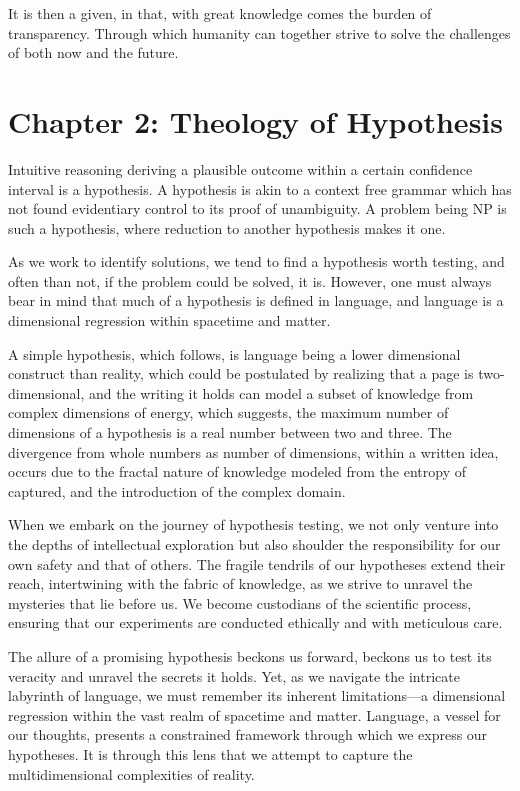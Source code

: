\documentclass[ebook,12pt,oneside,openany]{memoir}
\begin{document}
\indent 	It is then a given, in that, with great knowledge comes the burden of transparency. Through which humanity can together strive to solve the challenges of both now and the future.
\chapter*{Chapter 2: Theology of Hypothesis}


\indent \indent Intuitive reasoning deriving a plausible outcome within a certain confidence interval is a hypothesis. A hypothesis is akin to a context free grammar which has not found evidentiary control to its proof of unambiguity. A problem being NP is such a hypothesis, where reduction to another hypothesis makes it one.

\indent 	As we work to identify solutions, we tend to find a hypothesis worth testing, and often than not, if the problem could be solved, it is. However, one must always bear in mind that much of a hypothesis is defined in language, and language is a dimensional regression within spacetime and matter.

\indent 	A simple hypothesis, which follows, is language being a lower dimensional construct than reality, which could be postulated by realizing that a page is two-dimensional, and the writing it holds can model a subset of knowledge from complex dimensions of energy,  which suggests, the maximum number of dimensions of a hypothesis is a real number between two and three. The divergence from whole numbers as number of dimensions, within a written idea, occurs due to the fractal nature of knowledge modeled from the entropy of captured, and the introduction of the complex domain.

\indent When we embark on the journey of hypothesis testing, we not only venture into the depths of intellectual exploration but also shoulder the responsibility for our own safety and that of others. The fragile tendrils of our hypotheses extend their reach, intertwining with the fabric of knowledge, as we strive to unravel the mysteries that lie before us. We become custodians of the scientific process, ensuring that our experiments are conducted ethically and with meticulous care.

\indent The allure of a promising hypothesis beckons us forward, beckons us to test its veracity and unravel the secrets it holds. Yet, as we navigate the intricate labyrinth of language, we must remember its inherent limitations—a dimensional regression within the vast realm of spacetime and matter. Language, a vessel for our thoughts, presents a constrained framework through which we express our hypotheses. It is through this lens that we attempt to capture the multidimensional complexities of reality.
\end{document}

